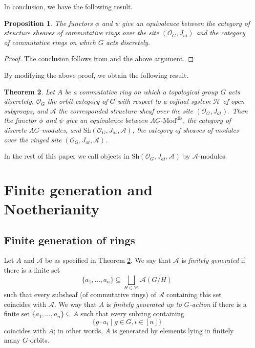 \documentclass[11pt, reqno]{amsart}
\theoremstyle{plain}
\newtheorem{theorem}{Theorem}[section]
\newtheorem{proposition}[theorem]{Proposition}
\numberwithin{equation}{section}
\theoremstyle{definition}
\newcommand{\Mod}{{\textrm{-}\mathrm{Mod}}}
\newcommand{\dis}{{\mathrm{dis}}}
\newcommand{\Sh}{{\mathrm{Sh}}}
\begin{document}
In conclusion, we have the following result.

\begin{proposition} \label{G-rings and structure sheaves}
The functors $\phi$ and $\psi$ give an equivalence between the category of structure sheaves of commutative rings over the site $(\mathcal{O}_G, J_{at})$ and the category of commutative rings on which $G$ acts discretely.
\end{proposition}

\begin{proof}
The conclusion follows from \cite[Theorem III.9.1]{MM} and the above argument.
\end{proof}

By modifying the above proof, we obtain the following result.

\begin{theorem} \label{equivalence of categories}
Let $A$ be a commutative ring on which a topological group $G$ acts discretely, $\mathcal{O}_G$ the orbit category of $G$ with respect to a cofinal system $\mathcal{H}$ of open subgroups, and $\mathcal{A}$ the corresponded structure sheaf over the site $(\mathcal{O}_G, J_{at})$. Then the functor $\phi$ and $\psi$ give an equivalence between $AG \Mod^{\dis}$, the category of discrete $AG$-modules, and $\Sh(\mathcal{O}_G, J_{at}, \mathcal{A})$, the category of sheaves of modules over the ringed site $(\mathcal{O}_G, J_{at}, \mathcal{A})$.
\end{theorem}

In the rest of this paper we call objects in $\Sh(\mathcal{O}_G, J_{at}, \mathcal{A})$ by $\mathcal{A}$-modules.


\section{Finite generation and Noetherianity}

\subsection{Finite generation of rings}

Let $A$ and $\mathcal{A}$ be as specified in Theorem \ref{equivalence of categories}. We say that $\mathcal{A}$ is \textit{finitely generated} if there is a finite set
\[
\{a_1, \ldots, a_n\} \subseteq \bigsqcup_{H \in \mathcal{H}} \mathcal{A}(G/H)
\]
such that every subsheaf (of commutative rings) of $\mathcal{A}$ containing this set coincides with $\mathcal{A}$. We way that $A$ is \textit{finitely generated up to $G$-action} if there is a finite set $\{a_1, \ldots, a_n\} \subseteq A$ such that every subring containing
\[
\{ g \cdot a_i \mid g \in G, i \in [n] \}
\]
coincides with $A$; in other words, $A$ is generated by elements lying in finitely many $G$-orbits.
\end{document}
